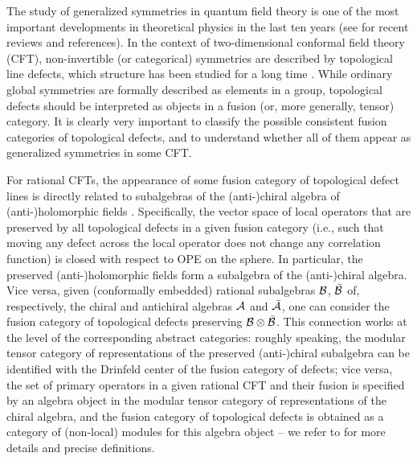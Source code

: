 \documentclass[11pt,reqno]{article}
\newcommand{\CA}{{\cal A}}
\newcommand{\CB}{{\cal B}}
\begin{document}
The study of generalized symmetries in quantum field theory is one of the most important developments in theoretical physics in the last ten years (see \cite{McGreevy:2022oyu,Freed:2022iao,Shao:2023gho,Brennan:2023mmt,Bhardwaj:2023kri,Gomes:2023ahz,Schafer-Nameki:2023jdn,Luo:2023ive,Kaidi:2026urc} for recent reviews and references). In the context of two-dimensional conformal field theory (CFT), non-invertible (or categorical) symmetries are described by topological line defects, which structure has been studied for a long time \cite{Verlinde:1988sn,Petkova:2000ip,Fuchs:2002cm,Fuchs:2003id,Fuchs:2004dz,Frohlich:2004ef,Fuchs:2004xi,Frohlich:2006ch,Frohlich:2009gb,Chang_2019}. While ordinary global symmetries are formally described as elements in a group, topological defects should be interpreted as objects in a fusion (or, more generally, tensor) category. It is clearly very important to classify the possible consistent fusion categories of topological defects, and to understand whether all of them appear as generalized symmetries in some CFT.

For rational CFTs, the appearance of some fusion category of topological defect lines is directly related to subalgebras of the (anti-)chiral algebra of (anti-)holomorphic fields \cite{Rayhaun:2023pgc,Gannon:2026ttf}. Specifically, the vector space of local operators that are preserved by all topological defects in a given fusion category (i.e., such that moving any defect across the local operator does not change  any correlation function) is closed with respect to OPE on the sphere. In particular, the preserved (anti-)holomorphic fields form a subalgebra of the (anti-)chiral algebra. Vice versa, given (conformally embedded) rational subalgebras $\CB$, $\bar\CB$ of, respectively, the chiral and antichiral algebras $\CA$ and $\bar\CA$, one can consider the fusion category of topological defects preserving $\CB\otimes \bar\CB$. This connection works at the level of the corresponding abstract categories: roughly speaking, the modular tensor category of representations of the preserved (anti-)chiral subalgebra can be identified with the Drinfeld center of the fusion category of defects; vice versa, the set of primary operators in a given rational CFT and their fusion is specified by an algebra object in the modular tensor category of representations of the chiral algebra, and the fusion category of topological defects is obtained as a category of (non-local) modules for this algebra object -- we refer to \cite{Moller:2024xtt,Rayhaun:2023pgc,Gannon:2026ttf} for more details and precise definitions.
\end{document}
